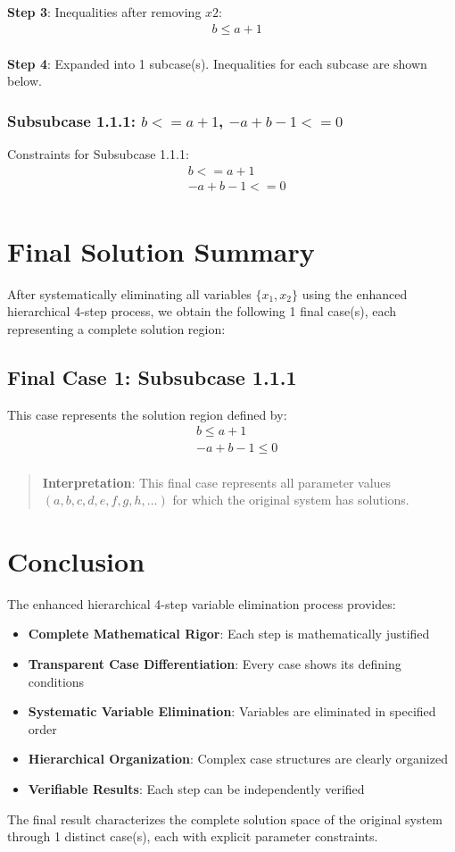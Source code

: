 \documentclass{article}
\newenvironment{stepdetail}
  {\begin{quote}\small\color{blue}}
  {\end{quote}}
\begin{document}
\textbf{Step 3}: Inequalities after removing $x2$:
\begin{align}
& b \leq a + 1 \\
\end{align}

\textbf{Step 4}: Expanded into 1 subcase(s). Inequalities for each subcase are shown below.

\subsubsection{Subsubcase 1.1.1: $b <= a + 1$, $-a + b - 1 <= 0$}

Constraints for Subsubcase 1.1.1:
\begin{align}
& b <= a + 1 \\
& - a + b - 1 <= 0 \\
\end{align}

\section{Final Solution Summary}

After systematically eliminating all variables $\{x_{1}, x_{2}\}$
using the enhanced hierarchical 4-step process, we obtain the following
1 final case(s), each representing a complete solution region:

\subsection{Final Case 1: Subsubcase 1.1.1}

This case represents the solution region defined by:
\begin{align}
& b \leq a + 1 \\
& - a + b - 1 \leq 0 \\
\end{align}

\begin{stepdetail}
\textbf{Interpretation}: This final case represents all parameter values
$(a, b, c, d, e, f, g, h, \ldots)$ for which the original system has solutions.
\end{stepdetail}

\section{Conclusion}

The enhanced hierarchical 4-step variable elimination process provides:
\begin{itemize}
\item \textbf{Complete Mathematical Rigor}: Each step is mathematically justified
\item \textbf{Transparent Case Differentiation}: Every case shows its defining conditions
\item \textbf{Systematic Variable Elimination}: Variables are eliminated in specified order
\item \textbf{Hierarchical Organization}: Complex case structures are clearly organized
\item \textbf{Verifiable Results}: Each step can be independently verified
\end{itemize}

The final result characterizes the complete solution space of the original system
through 1 distinct case(s), each with explicit parameter constraints.
\end{document}
